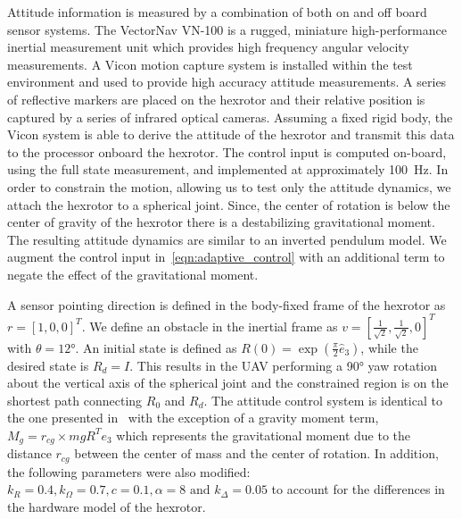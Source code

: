 Attitude information is measured by a combination of both on and off board sensor systems.
The VectorNav VN-100 is a rugged, miniature high-performance inertial measurement unit which provides high frequency angular velocity measurements.
A Vicon motion capture system is installed within the test environment and used to provide high accuracy attitude measurements. 
A series of reflective markers are placed on the hexrotor and their relative position is captured by a series of infrared optical cameras. 
Assuming a fixed rigid body, the Vicon system is able to derive the attitude of the hexrotor and transmit this data to the processor onboard the hexrotor.
The control input is computed on-board, using the full state measurement, and implemented at approximately \SI{100}{\hertz}.
In order to constrain the motion, allowing us to test only the attitude dynamics, we attach the hexrotor to a spherical joint.
Since, the center of rotation is below the center of gravity of the hexrotor there is a destabilizing gravitational moment.
The resulting attitude dynamics are similar to an inverted pendulum model.
We augment the control input in~\cref{eqn:adaptive_control} with an additional term to negate the effect of the gravitational moment.

A sensor pointing direction is defined in the body-fixed frame of the hexrotor as \( r = [1,0,0]^T \).
We define an obstacle in the inertial frame as \( v = [\frac{1}{\sqrt{2}}, \frac{1}{\sqrt{2}}, 0]^T \) with \( \theta = \ang{12} \).
An initial state is defined as \(R(0) = \exp( \frac{\pi}{2} \hat{e}_3) \), while the desired state is \(R_d =I \).
This results in the UAV performing a \ang{90} yaw rotation about the vertical axis of the spherical joint and the constrained region is on the shortest path connecting $R_0$ and $R_d$. 
The attitude control system is identical to the one presented in~ with the exception of a gravity moment term, \( M_g = r_{cg} \times m g R^T e_3\) which represents the gravitational moment due to the distance \( r_{cg} \) between the center of mass and the center of rotation. 
In addition, the following parameters were also modified: \(k_R = 0.4, k_\Omega = 0.7 ,c = 0.1 , \alpha = 8 \text{ and } k_\Delta = 0.05\) to account for the differences in the hardware model of the hexrotor.

